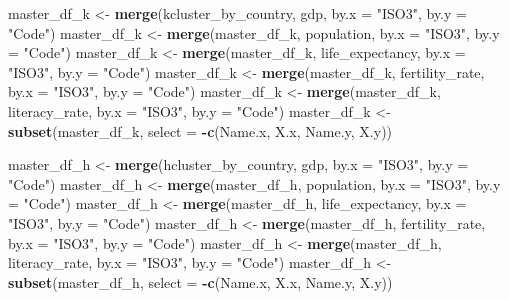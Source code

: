 \documentclass[]{article}
\newenvironment{Shaded}{\begin{snugshade}}{\end{snugshade}}
\newcommand{\DataTypeTok}[1]{\textcolor[rgb]{0.13,0.29,0.53}{#1}}
\newcommand{\KeywordTok}[1]{\textcolor[rgb]{0.13,0.29,0.53}{\textbf{#1}}}
\newcommand{\NormalTok}[1]{#1}
\newcommand{\OperatorTok}[1]{\textcolor[rgb]{0.81,0.36,0.00}{\textbf{#1}}}
\newcommand{\StringTok}[1]{\textcolor[rgb]{0.31,0.60,0.02}{#1}}
\begin{document}
\begin{Shaded}
\begin{Highlighting}[]
\NormalTok{master_df_k <-}\StringTok{ }\KeywordTok{merge}\NormalTok{(kcluster_by_country, gdp, }\DataTypeTok{by.x =} \StringTok{"ISO3"}\NormalTok{, }\DataTypeTok{by.y =} \StringTok{"Code"}\NormalTok{)}
\NormalTok{master_df_k <-}\StringTok{ }\KeywordTok{merge}\NormalTok{(master_df_k, population, }\DataTypeTok{by.x =} \StringTok{"ISO3"}\NormalTok{, }\DataTypeTok{by.y =} \StringTok{"Code"}\NormalTok{)}
\NormalTok{master_df_k <-}\StringTok{ }\KeywordTok{merge}\NormalTok{(master_df_k, life_expectancy, }\DataTypeTok{by.x =} \StringTok{"ISO3"}\NormalTok{, }\DataTypeTok{by.y =} \StringTok{"Code"}\NormalTok{)}
\NormalTok{master_df_k <-}\StringTok{ }\KeywordTok{merge}\NormalTok{(master_df_k, fertility_rate, }\DataTypeTok{by.x =} \StringTok{"ISO3"}\NormalTok{, }\DataTypeTok{by.y =} \StringTok{"Code"}\NormalTok{)}
\NormalTok{master_df_k <-}\StringTok{ }\KeywordTok{merge}\NormalTok{(master_df_k, literacy_rate, }\DataTypeTok{by.x =} \StringTok{"ISO3"}\NormalTok{, }\DataTypeTok{by.y =} \StringTok{"Code"}\NormalTok{)}
\NormalTok{master_df_k <-}\StringTok{ }\KeywordTok{subset}\NormalTok{(master_df_k, }\DataTypeTok{select =} \OperatorTok{-}\KeywordTok{c}\NormalTok{(Name.x, X.x, Name.y, X.y))}

\NormalTok{master_df_h <-}\StringTok{ }\KeywordTok{merge}\NormalTok{(hcluster_by_country, gdp, }\DataTypeTok{by.x =} \StringTok{"ISO3"}\NormalTok{, }\DataTypeTok{by.y =} \StringTok{"Code"}\NormalTok{)}
\NormalTok{master_df_h <-}\StringTok{ }\KeywordTok{merge}\NormalTok{(master_df_h, population, }\DataTypeTok{by.x =} \StringTok{"ISO3"}\NormalTok{, }\DataTypeTok{by.y =} \StringTok{"Code"}\NormalTok{)}
\NormalTok{master_df_h <-}\StringTok{ }\KeywordTok{merge}\NormalTok{(master_df_h, life_expectancy, }\DataTypeTok{by.x =} \StringTok{"ISO3"}\NormalTok{, }\DataTypeTok{by.y =} \StringTok{"Code"}\NormalTok{)}
\NormalTok{master_df_h <-}\StringTok{ }\KeywordTok{merge}\NormalTok{(master_df_h, fertility_rate, }\DataTypeTok{by.x =} \StringTok{"ISO3"}\NormalTok{, }\DataTypeTok{by.y =} \StringTok{"Code"}\NormalTok{)}
\NormalTok{master_df_h <-}\StringTok{ }\KeywordTok{merge}\NormalTok{(master_df_h, literacy_rate, }\DataTypeTok{by.x =} \StringTok{"ISO3"}\NormalTok{, }\DataTypeTok{by.y =} \StringTok{"Code"}\NormalTok{)}
\NormalTok{master_df_h <-}\StringTok{ }\KeywordTok{subset}\NormalTok{(master_df_h, }\DataTypeTok{select =} \OperatorTok{-}\KeywordTok{c}\NormalTok{(Name.x, X.x, Name.y, X.y))}
\end{Highlighting}
\end{Shaded}
\end{document}
